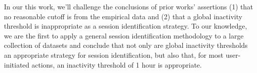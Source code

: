 In our this work, we'll challenge the conclusions of prior works' assertions (1) that no reasonable cutoff is from the empirical data and (2) that a global inactivity threshold is inappropriate as a session identification strategy.  To our knowledge, we are the first to apply a general session identification methodology to a large collection of datasets and conclude that not only are global inactivity thresholds an appropriate strategy for session identification, but also that, for most user-initiated actions, an inactivity threshold of 1 hour is appropriate.
